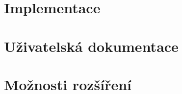 \chapter{Implementace}
\chapter{Uživatelská dokumentace}
\chapter{Možnosti rozšíření}
\citet[str.29]{Andel07}